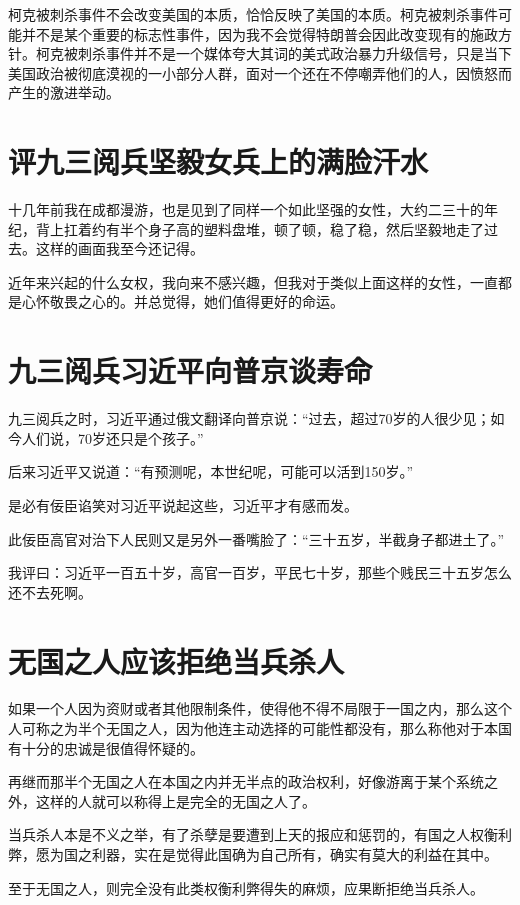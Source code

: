 \documentclass[12pt,oneside]{book}
\begin{document}
柯克被刺杀事件不会改变美国的本质，恰恰反映了美国的本质。柯克被刺杀事件可能并不是某个重要的标志性事件，因为我不会觉得特朗普会因此改变现有的施政方针。柯克被刺杀事件并不是一个媒体夸大其词的美式政治暴力升级信号，只是当下美国政治被彻底漠视的一小部分人群，面对一个还在不停嘲弄他们的人，因愤怒而产生的激进举动。



\chapter{评九三阅兵坚毅女兵上的满脸汗水}
十几年前我在成都漫游，也是见到了同样一个如此坚强的女性，大约二三十的年纪，背上扛着约有半个身子高的塑料盘堆，顿了顿，稳了稳，然后坚毅地走了过去。这样的画面我至今还记得。

近年来兴起的什么女权，我向来不感兴趣，但我对于类似上面这样的女性，一直都是心怀敬畏之心的。并总觉得，她们值得更好的命运。




\chapter{九三阅兵习近平向普京谈寿命}
九三阅兵之时，习近平通过俄文翻译向普京说：“过去，超过70岁的人很少见；如今人们说，70岁还只是个孩子。”

后来习近平又说道：“有预测呢，本世纪呢，可能可以活到150岁。”

是必有佞臣谄笑对习近平说起这些，习近平才有感而发。

此佞臣高官对治下人民则又是另外一番嘴脸了：“三十五岁，半截身子都进土了。”

我评曰：习近平一百五十岁，高官一百岁，平民七十岁，那些个贱民三十五岁怎么还不去死啊。


\chapter{无国之人应该拒绝当兵杀人}
如果一个人因为资财或者其他限制条件，使得他不得不局限于一国之内，那么这个人可称之为半个无国之人，因为他连主动选择的可能性都没有，那么称他对于本国有十分的忠诚是很值得怀疑的。

再继而那半个无国之人在本国之内并无半点的政治权利，好像游离于某个系统之外，这样的人就可以称得上是完全的无国之人了。

当兵杀人本是不义之举，有了杀孽是要遭到上天的报应和惩罚的，有国之人权衡利弊，愿为国之利器，实在是觉得此国确为自己所有，确实有莫大的利益在其中。

至于无国之人，则完全没有此类权衡利弊得失的麻烦，应果断拒绝当兵杀人。
\end{document}
